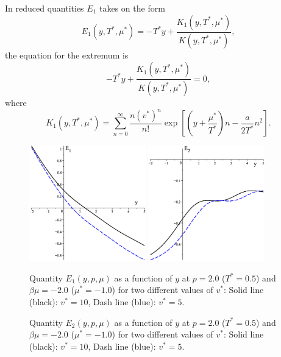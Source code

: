 \documentclass[12pt]{article}
\numberwithin{equation}{section}
\begin{document}
	\begin{mdframed}[linecolor=black,linewidth=1pt,leftline=true]
		In reduced quantities $E_1$ takes on the form
		\begin{equation}
			\label{def:reducedE1}
			E_1(y,T^*,\mu^*) = -T^* y + \frac{K_1(y,T^*,\mu^*)}{K(y,T^*,\mu^*)},
		\end{equation}
		the equation for the extremum is
		\begin{equation}
			\label{eq:bary2}
			-T^* y + \frac{K_1(y,T^*,\mu^*)}{K(y,T^*,\mu^*)} = 0,
		\end{equation}
		where
		\begin{equation}
			K_1(y,T^*,\mu^*) = \sum_{n=0}^{\infty} \frac{n (v^*)^n}{n!} \exp[\left(y+\frac{\mu^*}{T^*}\right)n - \frac{a}{2T^*}n^2].
		\end{equation}
	\end{mdframed}
	
	\begin{figure}[htbp]
		\includegraphics[width=0.45\textwidth,angle=0]{E1_vs_y2}
		\hfill
		\includegraphics[width=0.45\textwidth,angle=0]{E2_vs_y}
		\\
		\parbox{0.45\textwidth}{\caption{\label{fig:E1_vs_y} Quantity $E_1(y,p,\mu)$ as a function of $y$ at $p=2.0$ ($T^*=0.5$) and $\beta\mu=-2.0$ ($\mu^*=-1.0$) for two different values of $v^*$: Solid line (black): $v^* = 10$, Dash line (blue): $v^* = 5$.}}
		\hfill
		\parbox{0.45\textwidth}{\caption{\label{fig:E2_vs_y} Quantity $E_2(y,p,\mu)$ as a function of $y$ at $p=2.0$ ($T^*=0.5$) and $\beta\mu=-2.0$ ($\mu^*=-1.0$) for two different values of $v^*$: Solid line (black): $v^* = 10$, Dash line (blue): $v^* = 5$.}}
	\end{figure}
	
\end{document}
